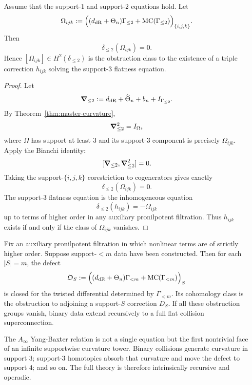 \begin{theorem}\label{thm:first-obstruction}
Assume that the support-$1$ and support-$2$ equations hold. Let
\[
 \Omega_{ijk}:=\Big((d_{\mathrm{dR}}+\Theta_n)\Gamma_{\le 2}+\mathrm{MC}(\Gamma_{\le 2})\Big)_{\{i,j,k\}}.
\]
Then
\[
 \delta_{\le 2}(\Omega_{ijk})=0.
\]
Hence $[\Omega_{ijk}]\in H^2(\delta_{\le 2})$ is the obstruction class to the existence of a triple correction $h_{ijk}$ solving the support-$3$ flatness equation.
\end{theorem}

\begin{proof}
Let
\[
 \boldsymbol{\nabla}_{\le 2}:=d_{\mathrm{dR}}+\widehat\Theta_n+b_n+I_{\Gamma_{\le 2}}.
\]
By Theorem~\ref{thm:master-curvature},
\[
 \boldsymbol{\nabla}_{\le 2}^2 = I_{\Omega},
\]
where $\Omega$ has support at least $3$ and its support-$3$ component is precisely $\Omega_{ijk}$. Apply the Bianchi identity:
\[
 [\boldsymbol{\nabla}_{\le 2},\boldsymbol{\nabla}_{\le 2}^2]=0.
\]
Taking the support-$\{i,j,k\}$ corestriction to cogenerators gives exactly
\[
 \delta_{\le 2}(\Omega_{ijk})=0.
\]
The support-$3$ flatness equation is the inhomogeneous equation
\[
 \delta_{\le 2}(h_{ijk})=-\Omega_{ijk}
\]
up to terms of higher order in any auxiliary pronilpotent filtration. Thus $h_{ijk}$ exists if and only if the class of $\Omega_{ijk}$ vanishes.
\end{proof}

\begin{corollary}\label{cor:recursive-support}
Fix an auxiliary pronilpotent filtration in which nonlinear terms are of strictly higher order. Suppose support-$<m$ data have been constructed. Then for each $|S|=m$, the defect
\[
 \mathfrak O_S:=\Big((d_{\mathrm{dR}}+\Theta_n)\Gamma_{<m}+\mathrm{MC}(\Gamma_{<m})\Big)_S
\]
is closed for the twisted differential determined by $\Gamma_{<m}$. Its cohomology class is the obstruction to adjoining a support-$S$ correction $D_S$. If all these obstruction groups vanish, binary data extend recursively to a full flat collision superconnection.
\end{corollary}

\begin{remark}
The $A_\infty$ Yang-Baxter relation is not a single equation but the first nontrivial face of an infinite supportwise curvature tower. Binary collisions generate curvature in support $3$; support-$3$ homotopies absorb that curvature and move the defect to support $4$; and so on. The full theory is therefore intrinsically recursive and operadic.
\end{remark}

